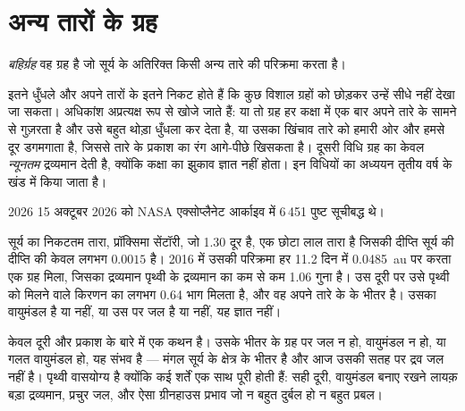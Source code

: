 \section{अन्य तारों के ग्रह}

\begin{definition}[बहिर्ग्रह]\label{def:g10:habitable-planet:exoplanet}
\emph{बहिर्ग्रह} वह ग्रह है जो सूर्य के अतिरिक्त किसी अन्य तारे की
परिक्रमा करता है।
\end{definition}

 इतने धुँधले और अपने तारों के इतने निकट होते हैं कि कुछ विशाल ग्रहों को छोड़कर
उन्हें सीधे नहीं देखा जा सकता। अधिकांश अप्रत्यक्ष रूप से खोजे जाते हैं: या तो ग्रह हर कक्षा में
एक बार अपने तारे के सामने से गुज़रता है और उसे बहुत थोड़ा धुँधला कर देता है,
या उसका खिंचाव तारे को हमारी ओर और हमसे दूर डगमगाता है, जिससे तारे के प्रकाश का
रंग आगे-पीछे खिसकता है। दूसरी विधि ग्रह का केवल
\emph{न्यूनतम} द्रव्यमान देती है, क्योंकि कक्षा का झुकाव ज्ञात नहीं होता। इन विधियों का
अध्ययन तृतीय वर्ष के खंड में किया जाता है।

\begin{dated}{2026}
15 अक्टूबर 2026 को NASA एक्सोप्लैनेट आर्काइव में 6\,451 पुष्ट 
सूचीबद्ध थे।
\end{dated}

\begin{example}[प्रॉक्सिमा b]\label{ex:g10:habitable-planet:proxima}
सूर्य का निकटतम तारा, प्रॉक्सिमा सेंटॉरी, जो \qty{1.30}{\parsec} दूर है, एक
छोटा लाल तारा है जिसकी दीप्ति सूर्य की दीप्ति की केवल लगभग $0.0015$ है।
2016 में उसकी परिक्रमा हर 11.2 दिन में \qty{0.0485}{au} पर करता एक ग्रह मिला,
जिसका द्रव्यमान पृथ्वी के द्रव्यमान का कम से कम 1.06 गुना है। उस दूरी पर उसे पृथ्वी को मिलने
वाले किरणन का लगभग 0.64 भाग मिलता है, और वह अपने तारे के  के भीतर है।
उसका वायुमंडल है या नहीं, या उस पर जल है या नहीं, यह ज्ञात नहीं।
\end{example}

\begin{remark}[वासयोग्य का अर्थ बसा हुआ नहीं]\label{rem:g10:habitable-planet:inhabited}
 केवल दूरी और प्रकाश के बारे में एक कथन है। उसके भीतर के ग्रह पर जल न हो,
वायुमंडल न हो, या गलत वायुमंडल हो, यह संभव है --- मंगल सूर्य के क्षेत्र के भीतर है और आज
उसकी सतह पर द्रव जल नहीं है। पृथ्वी वासयोग्य है क्योंकि कई शर्तें एक साथ पूरी होती हैं:
सही दूरी, वायुमंडल बनाए रखने लायक़ बड़ा द्रव्यमान, प्रचुर जल, और ऐसा ग्रीनहाउस
प्रभाव जो न बहुत दुर्बल हो न बहुत प्रबल।
\end{remark}

